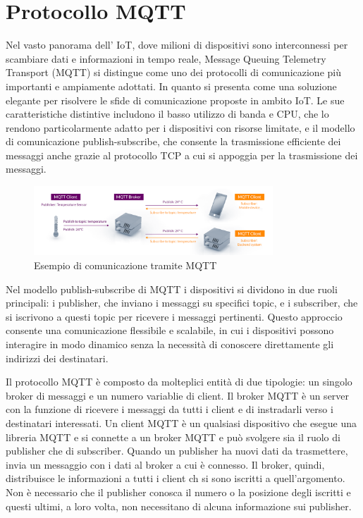 \documentclass[12pt,a4paper,openright,twoside]{book}
\begin{document}
\section{Protocollo MQTT}

Nel vasto panorama dell' \ac{IoT}, dove milioni di dispositivi sono interconnessi per scambiare dati e informazioni in tempo reale, Message Queuing Telemetry Transport (MQTT) 
si distingue come uno dei protocolli di comunicazione più importanti e ampiamente adottati. In quanto si presenta come una soluzione elegante per risolvere le sfide di 
comunicazione proposte in ambito \ac*{IoT}. Le sue caratteristiche distintive includono il basso utilizzo di banda e CPU, che lo rendono particolarmente adatto per i 
dispositivi con risorse limitate, e il modello di comunicazione publish-subscribe, che consente la trasmissione efficiente dei messaggi anche grazie al protocollo 
\ac{TCP} a cui si appoggia per la trasmissione dei messaggi.

\begin{figure}[h]
    \centering
    \includegraphics[width=0.8\textwidth]{figures/mqtt-example.png}
    \caption{Esempio di comunicazione tramite MQTT}
    \label{fig:mqtt-example}
\end{figure}

Nel modello publish-subscribe di \ac{MQTT} i dispositivi si dividono in due ruoli principali:
 i publisher, che inviano i messaggi su specifici topic, e i subscriber, che si iscrivono a questi topic per ricevere i messaggi pertinenti. 
 Questo approccio consente una comunicazione flessibile e scalabile, in cui i dispositivi possono interagire in modo dinamico senza la necessità
 di conoscere direttamente gli indirizzi dei destinatari.

Il protocollo \ac{MQTT} è composto da molteplici entità di due tipologie: un singolo broker di messaggi e un numero variablie di client. Il broker \ac{MQTT} è un server 
con la funzione di ricevere i messaggi da tutti i client e di instradarli verso i destinatari interessati. Un client MQTT è un qualsiasi dispositivo che esegue una libreria 
\ac{MQTT} e si connette a un broker \ac{MQTT} e può svolgere sia il ruolo di publisher che di subscriber. Quando un publisher ha nuovi dati da trasmettere, 
invia un messaggio con i dati al broker a cui è connesso. Il broker, quindi, distribuisce le informazioni a tutti i client ch si sono iscritti a quell’argomento. 
Non è necessario che il publisher conosca il numero o la posizione degli iscritti e questi ultimi, a loro volta, non necessitano di alcuna informazione sui publisher.
\end{document}
